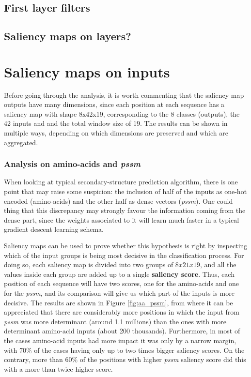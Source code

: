 	\subsection{First layer filters}
	
	\subsection*{Saliency maps on layers?}


\section{Saliency maps on inputs}

Before going through the analysis, it is worth commenting that the saliency map outputs have many dimensions, since each position at each sequence has a saliency map with shape 8x42x19, corresponding to the 8 classes (outputs), the 42 inputs and and the total window size of 19. The results can be shown in multiple ways, depending on which dimensions are preserved and which are aggregated. 


\subsubsection*{Analysis on amino-acids and \textit{pssm}}
When looking at typical secondary-structure prediction algorithm, there is one point that may raise some suspicion: the inclusion of half of the inputs as one-hot encoded (amino-acids) and the other half as dense vectors (\textit{pssm}). One could thing that this discrepancy may strongly favour the information coming from the dense part, since the weights associated to it will learn much faster in a typical gradient descent learning schema.

Saliency maps can be used to prove whether this hypothesis is right by inspecting which of the input groups is being most decisive in the classification process. For doing so, each saliency map is divided into two groups of $8x21x19$, and all the values inside each group are added up to a single \textbf{saliency score}. Thus, each position of each sequence will have two scores, one for the amino-acids and one for the \textit{pssm}, and its comparison will give us which part of the inputs is more decisive. The results are shown in Figure \ref{fig:aa_pssm}, from where it can be appreciated that there are considerably more positions in which the input from \textit{pssm} was more determinant (around 1.1 millions) than the ones with more determinant amino-acid inputs (about 200 thousands). Furthermore, in most of the cases amino-acid inputs had more impact it was only by a narrow margin, with 70\% of the cases having only up to two times bigger saliency scores. On the contrary, more than 60\% of the positions with higher \textit{pssm} saliency score did this with a more than twice higher score.

